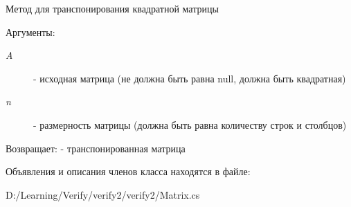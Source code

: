 Метод для транспонирования квадратной матрицы \begin{Desc}
\item[Аргументы:]
\begin{description}
\item[{\em A}]- исходная матрица (не должна быть равна null, должна быть квадратная) \item[{\em n}]- размерность матрицы (должна быть равна количеству строк и столбцов) \end{description}
\end{Desc}
\begin{Desc}
\item[Возвращает:]- транспонированная матрица \end{Desc}


Объявления и описания членов класса находятся в файле:\begin{CompactItemize}
\item 
D:/Learning/Verify/verify2/verify2/Matrix.cs\end{CompactItemize}
